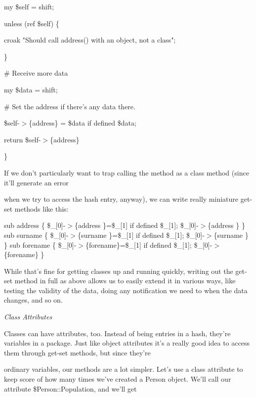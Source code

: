 \documentclass[a4paper,11pt]{book}
\begin{document}
\noindent my \$self = shift;

\noindent unless (ref \$self) \{

\noindent croak "Should call address() with an object, not a class";

\noindent \}

\noindent 

\noindent \# Receive more data

\noindent my \$data = shift;

\noindent \# Set the address if there's any data there.

\noindent \$self-$>$\{address\} = \$data if defined \$data;

\noindent 

\noindent return \$self-$>$\{address\}

\noindent \}

\noindent 

\noindent 

\noindent If we don't particularly want to trap calling the method as a class method (since it'll generate an error

\noindent when we try to access the hash entry, anyway), we can write really miniature get-set methods like this:

\noindent 

\noindent sub address  \{ \$\_[0]-$>$\{address \}=\$\_[1] if defined \$\_[1]; \$\_[0]-$>$\{address \} \} sub surname  \{ \$\_[0]-$>$\{surname \}=\$\_[1] if defined \$\_[1]; \$\_[0]-$>$\{surname \} \} sub forename \{ \$\_[0]-$>$\{forename\}=\$\_[1] if defined \$\_[1]; \$\_[0]-$>$\{forename\} \}

\noindent 

\noindent While that's fine for getting classes up and running quickly, writing out the get-set method in full as above allows us to easily extend it in various ways, like testing the validity of the data, doing any notification we need to when the data changes, and so on.

\noindent 

\noindent \textit{Class Attributes}

\noindent Classes can have attributes, too. Instead of being entries in a hash, they're variables in a package. Just like object attributes it's a really good idea to access them through get-set methods, but since they're

\noindent ordinary variables, our methods are a lot simpler. Let's use a class attribute to keep score of how many times we've created a Person object. We'll call our attribute \$Person::Population, and we'll get
\end{document}
